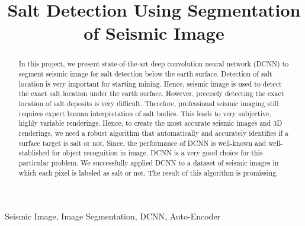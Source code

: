 \documentclass[conference]{IEEEtran}
\begin{document}
\title{Salt Detection Using Segmentation of Seismic Image
}

\author{
}

\maketitle

\begin{abstract}
In this project, we present state-of-the-art deep convolution neural network (DCNN) to segment seismic image for salt detection below the earth surface. Detection of salt location is very important for starting mining. Hence, seismic image is used to detect the exact salt location under the earth surface. However, precisely detecting the exact location of salt deposits is very difficult. Therefore, professional seismic imaging still requires expert human interpretation of salt bodies. This leads to very subjective, highly variable renderings. Hence, to create the most accurate seismic images and 3D renderings, we need a robust algorithm that automatically and accurately identifies if a surface target is salt or not. Since, the performance of DCNN is well-known and well-stablished for object recognition in image, DCNN is a very good choice for this particular problem. We successfully applied DCNN to a dataset of seismic images in which each pixel is labeled as salt or not. The result of this algorithm is promissing.
\end{abstract}

\begin{IEEEkeywords}
Seismic Image, Image Segmentation, DCNN, Auto-Encoder
\end{IEEEkeywords}
\end{document}
